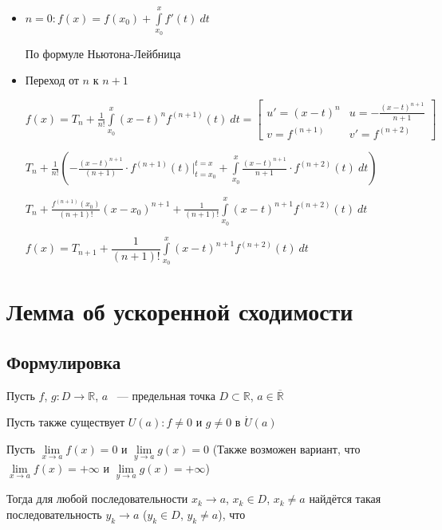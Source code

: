 \documentclass{article}
\begin{document}
			\begin{itemize}

				\item $n = 0 : f(x) = f(x_0) + \int\limits^x_{x_0} f'(t) \ dt$

					По формуле Ньютона-Лейбница

				\item Переход от $n$ к $n + 1$

					$f(x) = T_n + \frac{1}{n!} \int\limits^x_{x_0} (x - t)^n f^{(n + 1)} (t) \ dt = \begin{bmatrix} u' = (x - t)^n & u = -\frac{(x - t)^{n + 1}}{n + 1} \\ v = f^{(n + 1)} & v' = f^{(n + 2)} \end{bmatrix}$
						
					$T_n + \frac{1}{n!} \left( -\frac{(x - t)^{n + 1}}{(n + 1)} \cdot f^{(n + 1)} (t) \bigg|^{t = x}_{t = x_0} + \int\limits^x_{x_0} \frac{(x - t)^{n + 1}}{n + 1} \cdot f^{(n + 2)} (t) \ dt \right)$ 
					
					$T_n + \frac{f^{(n + 1)} (x_0)}{(n + 1)!} (x - x_0)^{n + 1} + \frac{1}{(n + 1)!} \int\limits^x_{x_0} (x - t)^{n + 1} f^{(n + 2)} (t) \ dt$
    
                    $f(x) = T_{n + 1} + \dfrac{1}{(n + 1)!} \int\limits^x_{x_0} (x - t)^{n + 1} f^{(n + 2)} (t) \ dt$
                    
			\end{itemize}

	\newpage

	\section{Лемма об ускоренной сходимости}
	
		\subsection{Формулировка}
		
			Пусть $f$, $g : D \rightarrow \mathbb{R}$, $a$ ~--- предельная точка $D \subset \mathbb{R}$, $a \in \overline{\mathbb{R}}$
		
			Пусть также существует $U(a) : f \neq 0$ и $g \neq 0$ в $\dot{U}(a)$
		
			Пусть $\lim\limits_{x \rightarrow a} f(x) = 0$ и $\lim\limits_{y \rightarrow a} g(x) = 0$ (Также возможен вариант, что $\lim\limits_{x \rightarrow a} f(x) = + \infty$ и $\lim\limits_{y \rightarrow a} g(x) = +\infty$)
			
			Тогда для любой последовательности $x_k \rightarrow a$, $x_k \in D$, $x_k \neq a$ найдётся такая последовательность $y_k \rightarrow a$ ($y_k \in D$, $y_k \neq a$), что 
			
\end{document}
